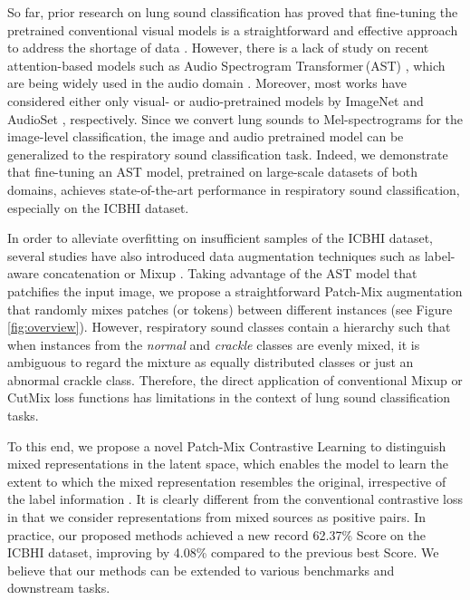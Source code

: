 \documentclass{INTERSPEECH2023}
\begin{document}
So far, prior research on lung sound classification has proved that fine-tuning the pretrained conventional visual models is a straightforward and effective approach to address the shortage of data \cite{gairola2021respirenet, nguyen2022lung, wang2022domain}.
However, there is a lack of study on recent attention-based models such as Audio Spectrogram Transformer\,(AST) \cite{gong2021ast}, which are being widely used in the audio domain \cite{gong2022ssast,baade2022mae}.
Moreover, most works have considered either only visual- or audio-pretrained models by ImageNet \cite{deng2009imagenet} and AudioSet \cite{audioset}, respectively.
Since we convert lung sounds to Mel-spectrograms for the image-level classification, the image and audio pretrained model can be generalized to the respiratory sound classification task.
Indeed, we demonstrate that fine-tuning an AST model, pretrained on large-scale datasets of both domains, achieves state-of-the-art performance in respiratory sound classification, especially on the ICBHI dataset.





In order to alleviate overfitting on insufficient samples of the ICBHI dataset, several studies have also introduced data augmentation techniques such as label-aware concatenation \cite{gairola2021respirenet} or Mixup \cite{wang2022domain}.
Taking advantage of the AST model that patchifies the input image, we propose a straightforward Patch-Mix augmentation that randomly mixes patches (or tokens) between different instances (see Figure\,\ref{fig:overview}).
However, respiratory sound classes contain a hierarchy such that when instances from the \textit{normal} and \textit{crackle} classes are evenly mixed, it is ambiguous to regard the mixture as equally distributed classes or just an abnormal crackle class. 
Therefore, the direct application of conventional Mixup \cite{zhang2017mixup} or CutMix \cite{yun2019cutmix} loss functions has limitations in the context of lung sound classification tasks. 


To this end, we propose a novel Patch-Mix Contrastive Learning to distinguish mixed representations in the latent space, which enables the model to learn the extent to which the mixed representation resembles the original, irrespective of the label information \cite{kim2020mixco, lee2020mix}. It is clearly different from the conventional contrastive loss \cite{chen2020simple, he2020momentum} in that we consider representations from mixed sources as positive pairs.
In practice, our proposed methods achieved a new record 62.37\% Score on the ICBHI dataset, improving by 4.08\% compared to the previous best Score.
We believe that our methods can be extended to various benchmarks and downstream tasks.
%
 
\end{document}
